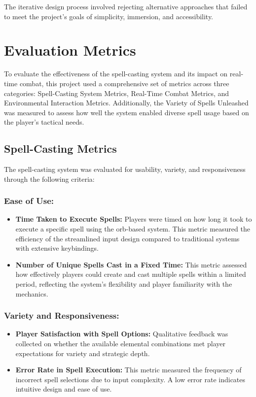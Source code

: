 \documentclass[10pt,twocolumn]{article}
\begin{document}
The iterative design process involved rejecting alternative approaches that failed to meet the project’s goals of simplicity, immersion, and accessibility.

\section{Evaluation Metrics}
To evaluate the effectiveness of the spell-casting system and its impact on real-time combat, this project used a comprehensive set of metrics across three categories: Spell-Casting System Metrics, Real-Time Combat Metrics, and Environmental Interaction Metrics. Additionally, the Variety of Spells Unleashed was measured to assess how well the system enabled diverse spell usage based on the player's tactical needs.

\subsection{Spell-Casting Metrics}
The spell-casting system was evaluated for usability, variety, and responsiveness through the following criteria:

\subsubsection{Ease of Use:}
\begin{itemize}
    \item \textbf{Time Taken to Execute Spells:} Players were timed on how long it took to execute a specific spell using the orb-based system. This metric measured the efficiency of the streamlined input design compared to traditional systems with extensive keybindings.
    \item \textbf{Number of Unique Spells Cast in a Fixed Time:} This metric assessed how effectively players could create and cast multiple spells within a limited period, reflecting the system’s flexibility and player familiarity with the mechanics.
\end{itemize}

\subsubsection{Variety and Responsiveness:}
\begin{itemize}
    \item \textbf{Player Satisfaction with Spell Options:} Qualitative feedback was collected on whether the available elemental combinations met player expectations for variety and strategic depth.
    \item \textbf{Error Rate in Spell Execution:} This metric measured the frequency of incorrect spell selections due to input complexity. A low error rate indicates intuitive design and ease of use.
\end{itemize}
\end{document}
